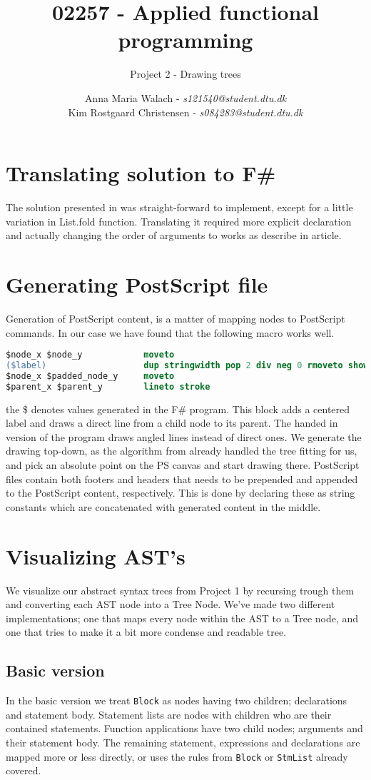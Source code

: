 \documentclass[10pt]{scrartcl}
\title{02257 - Applied functional programming}
\subtitle{Project 2 - Drawing trees}
\author{Anna Maria Walach - \textit {s121540@student.dtu.dk} \\ Kim Rostgaard Christensen - \textit {s084283@student.dtu.dk}}
\begin{document}
\maketitle
\section{Translating solution to F\#}
The solution presented in \cite{kennedy1996functional} was straight-forward to implement, except for a little variation in List.fold function. Translating it required more explicit declaration and actually changing the order of arguments to works as describe in article.
\section{Generating PostScript file}
Generation of PostScript content, is a matter of mapping nodes to PostScript commands. In our case we have found that the following macro works well.
\begin{lstlisting}[language=PostScript]
$node_x $node_y            moveto
($label)                   dup stringwidth pop 2 div neg 0 rmoveto show
$node_x $padded_node_y     moveto
$parent_x $parent_y        lineto stroke
\end{lstlisting}
the \$ denotes values generated in the F\# program. This block adds a centered label and draws a direct line from a child node to its parent. The handed in version of the program draws angled lines instead of direct ones.
We generate the drawing top-down, as the algorithm from \cite{kennedy1996functional} already handled the tree fitting for us, and pick an absolute point on the PS canvas and start drawing there.
PostScript files contain both footers and headers that needs to be prepended and appended to the PostScript content, respectively. This is done by declaring these as string constants which are concatenated with generated content in the middle.
\section{Visualizing AST's}
We visualize our abstract syntax trees from Project 1 by recursing trough them and converting each AST node into a Tree Node. We've made two different implementations; one that maps every node within the AST to a Tree node, and one that tries to make it a bit more condense and readable tree. 
\subsection{Basic version}
In the basic version we treat \texttt{Block} as nodes having two children; declarations and statement body. Statement lists are nodes with children who are their contained statements. Function applications have two child nodes; arguments and their statement body. The remaining statement, expressions and declarations are mapped more or less directly, or uses the rules from \texttt{Block} or \texttt{StmList} already covered.
\end{document}
